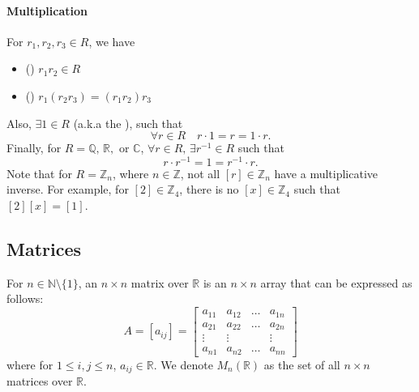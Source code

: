 \paragraph{Multiplication} For $r_1, r_2, r_3 \in R$, we have
\begin{itemize}
  \item () $r_1 r_2 \in R$
  \item () $r_1 (r_2 r_3) = (r_1 r_2) r_3$
\end{itemize}
Also, $\exists 1 \in R$ (a.k.a the ), such that
\begin{equation*}
  \forall r \in R \quad r \cdot 1 = r = 1 \cdot r.
\end{equation*}
Finally, for $R = \mathbb{Q}, \, \mathbb{R},$ or $\mathbb{C}$, $\forall r \in R, \, \exists r^{-1} \in R$ such that
\begin{equation*}
  r \cdot r^{-1} = 1 = r^{-1} \cdot r.
\end{equation*}
Note that for $R = \mathbb{Z}_n$, where $n \in \mathbb{Z}$, not all $[r] \in \mathbb{Z}_n$ have a multiplicative inverse. For example, for $[2] \in \mathbb{Z}_4$, there is no $[x] \in \mathbb{Z}_4$ such that $[2][x] = [1]$.


\subsection{Matrices}
  \label{sub:matrices}

For $n \in \mathbb{N} \setminus \{1\}$, an $n \times n$ matrix over $\mathbb{R}$  is an $n \times n$ array that can be expressed as follows:
\begin{equation*}
  A = [a_{ij}] = \begin{bmatrix}
    a_{11} & a_{12} & \hdots & a_{1n} \\
    a_{21} & a_{22} & \hdots & a_{2n} \\
    \vdots & \vdots &        & \vdots \\
    a_{n1} & a_{n2} & \hdots & a_{nn}
  \end{bmatrix}
\end{equation*}
where for $1 \leq i, j \leq n$, $a_{ij} \in \mathbb{R}$. We denote $M_n(\mathbb{R})$ as the set of all $n \times n$ matrices over $\mathbb{R}$.

